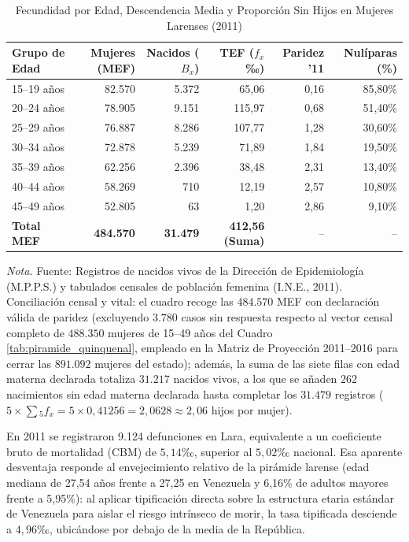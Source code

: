 \documentclass[12pt,letterpaper]{article}
\begin{document}
\begin{table}[htbp]
    \centering
    \caption{Fecundidad por Edad, Descendencia Media y Proporción Sin Hijos en Mujeres Larenses (2011)}
    \label{tab:fecundidad}
    \small
    \begin{tabular*}{\textwidth}{@{\extracolsep{\fill}}lrrrrr}
        \toprule
        \textbf{Grupo de Edad} & \textbf{Mujeres (MEF)} & \textbf{Nacidos ($B_x$)} & \textbf{TEF ($f_x$ ‰)} & \textbf{Paridez '11} & \textbf{Nulíparas (\%)} \\
        \midrule
        15--19 años & 82.570 & 5.372 & 65,06 & 0,16 & 85,80\% \\
        20--24 años & 78.905 & 9.151 & 115,97 & 0,68 & 51,40\% \\
        25--29 años & 76.887 & 8.286 & 107,77 & 1,28 & 30,60\% \\
        30--34 años & 72.878 & 5.239 & 71,89 & 1,84 & 19,50\% \\
        35--39 años & 62.256 & 2.396 & 38,48 & 2,31 & 13,40\% \\
        40--44 años & 58.269 & 710 & 12,19 & 2,57 & 10,80\% \\
        45--49 años & 52.805 & 63 & 1,20 & 2,86 & 9,10\% \\
        \midrule
        \textbf{Total MEF} & \textbf{484.570} & \textbf{31.479} & \textbf{412,56 (Suma)} & -- & -- \\
        \bottomrule
    \end{tabular*}
    \par\vspace{2pt}\noindent\raggedright \small \textit{Nota.} Fuente: Registros de nacidos vivos de la Dirección de Epidemiología (M.P.P.S.) y tabulados censales de población femenina (I.N.E., 2011). Conciliación censal y vital: el cuadro recoge las $484.570$ MEF con declaración válida de paridez (excluyendo $3.780$ casos sin respuesta respecto al vector censal completo de $488.350$ mujeres de 15--49 años del Cuadro \ref{tab:piramide_quinquenal}, empleado en la Matriz de Proyección 2011--2016 para cerrar las $891.092$ mujeres del estado); además, la suma de las siete filas con edad materna declarada totaliza $31.217$ nacidos vivos, a los que se añaden $262$ nacimientos sin edad materna declarada hasta completar los $31.479$ registros ($5 \times \sum {}_5f_x = 5 \times 0{,}41256 = 2{,}0628 \approx 2{,}06$ hijos por mujer).
\end{table}

En 2011 se registraron 9.124 defunciones en Lara, equivalente a un coeficiente bruto de mortalidad (CBM) de $5,14\text{‰}$, superior al $5,02\text{‰}$ nacional. Esa aparente desventaja responde al envejecimiento relativo de la pirámide larense (edad mediana de 27,54 años frente a 27,25 en Venezuela y 6,16\% de adultos mayores frente a 5,95\%): al aplicar tipificación directa sobre la estructura etaria estándar de Venezuela para aislar el riesgo intrínseco de morir, la tasa tipificada desciende a $4,96\text{‰}$, ubicándose por debajo de la media de la República.
\end{document}
